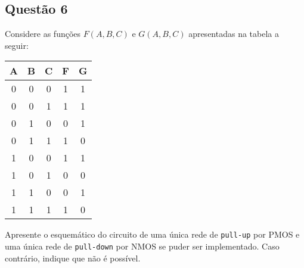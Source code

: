 \documentclass{article}
\begin{document}
\newpage
        \subsection{Questão 6}
            \begin{exercise}
                Considere as funções $F(A,B,C)$ e $G(A,B,C)$ apresentadas na tabela a seguir:
                    \begin{table}[H]
                        \centering  
                        \begin{tabular}[]{ccc|cc}\hline
                            A & B & C & F & G\\\hline
                            0 & 0 & 0 & 1 & 1\\
                            0 & 0 & 1 & 1 & 1\\
                            0 & 1 & 0 & 0 & 1\\
                            0 & 1 & 1 & 1 & 0\\
                            1 & 0 & 0 & 1 & 1\\
                            1 & 0 & 1 & 0 & 0\\
                            1 & 1 & 0 & 0 & 1\\
                            1 & 1 & 1 & 1 & 0\\\hline
                        \end{tabular}
                    \end{table}
                Apresente o esquemático do circuito de uma única rede de \texttt{pull-up} por PMOS e uma única rede de \texttt{pull-down} por NMOS se puder ser implementado. Caso contrário, indique que não é possível.
            \end{exercise}
\end{document}

